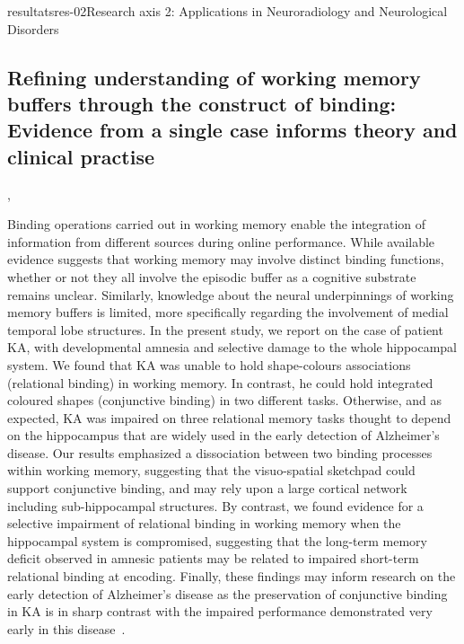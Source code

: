 \documentclass{ra2018}
\begin{document}
\begin{module}{resultats}{res-02}{Research axis 2: Applications in Neuroradiology and Neurological Disorders}
\subsection{Refining understanding of working memory buffers through the construct of binding: Evidence from a single case informs theory and clinical practise}
\begin{participants}
      ,
\end{participants}
Binding operations carried out in working memory enable the integration of information from different sources during online performance. While available evidence suggests that working memory may involve distinct binding functions, whether or not they all involve the episodic buffer as a cognitive substrate remains unclear. Similarly, knowledge about the neural underpinnings of working memory buffers is limited, more specifically regarding the involvement of medial temporal lobe structures. In the present study, we report on the case of patient KA, with developmental amnesia and selective damage to the whole hippocampal system. We found that KA was unable to hold shape-colours associations (relational binding) in working memory. In contrast, he could hold integrated coloured shapes (conjunctive binding) in two different tasks. Otherwise, and as expected, KA was impaired on three relational memory tasks thought to depend on the hippocampus that are widely used in the early detection of Alzheimer's disease. Our results emphasized a dissociation between two binding processes within working memory, suggesting that the visuo-spatial sketchpad could support conjunctive binding, and may rely upon a large cortical network including sub-hippocampal structures. By contrast, we found evidence for a selective impairment of relational binding in working memory when the hippocampal system is compromised, suggesting that the long-term memory deficit observed in amnesic patients may be related to impaired short-term relational binding at encoding. Finally, these findings may inform research on the early detection of Alzheimer's disease as the preservation of conjunctive binding in KA is in sharp contrast with the impaired performance demonstrated very early in this disease~\cite{jonin:inserm-01916090}.


\end{module}
\end{document}
